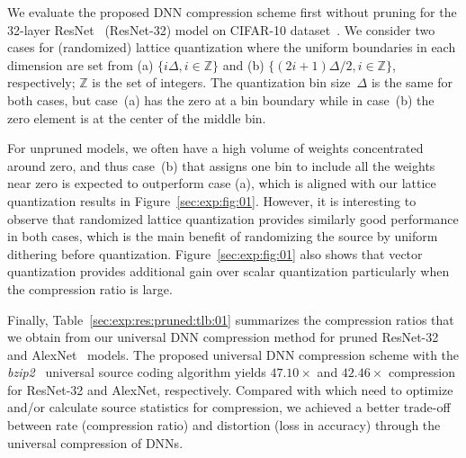 \documentclass{article}
\theoremstyle{remark}
\newcommand{\integer}{\mathbb{Z}}
\begin{document}
We evaluate the proposed DNN compression scheme first without pruning for the 32-layer ResNet~\cite{he2016deep} (ResNet-32) model %
on CIFAR-10 dataset~\cite{krizhevsky2009learning}. We consider two cases for (randomized) lattice quantization where the uniform boundaries in each dimension are set from (a) $\{i\Delta,i\in\integer\}$ and (b) $\{(2i+1)\Delta/2,i\in\integer\}$, respectively; $\integer$ is the set of integers. The quantization bin size~$\Delta$ is the same for both cases, but case~(a) has the zero at a bin boundary while in case~(b) the zero element is at the center of the middle bin.%

For unpruned models, we often have a high volume of weights concentrated around zero, and thus case~(b) that assigns one bin to include all the weights near zero is expected to outperform case (a), which is aligned with our lattice quantization results in Figure~\ref{sec:exp:fig:01}. However, it is interesting to observe that randomized lattice quantization provides similarly good performance in both cases, which is the main benefit of randomizing the source by uniform dithering before quantization. %
Figure~\ref{sec:exp:fig:01} also shows that vector quantization provides additional gain over scalar quantization particularly when the compression ratio is large.

Finally, Table~\ref{sec:exp:res:pruned:tlb:01} summarizes the compression ratios that we obtain from our universal DNN compression method for pruned ResNet-32 and AlexNet~\cite{krizhevsky2012imagenet} models. The proposed universal DNN compression scheme with the \emph{bzip2}~\cite{seward1998bzip2} universal source coding algorithm yields $47.10\times$ and $42.46\times$ compression for ResNet-32 and AlexNet, respectively. %
Compared with \cite{han2015deep,choi2016towards,agustsson2017soft} which need to optimize and/or calculate source statistics for compression, we achieved a better trade-off between rate (compression ratio) and distortion (loss in accuracy) through the universal compression of DNNs.

{\small
\newcommand{\BIBdecl}{\setlength{\itemsep}{0.25em}}


}
\end{document}
